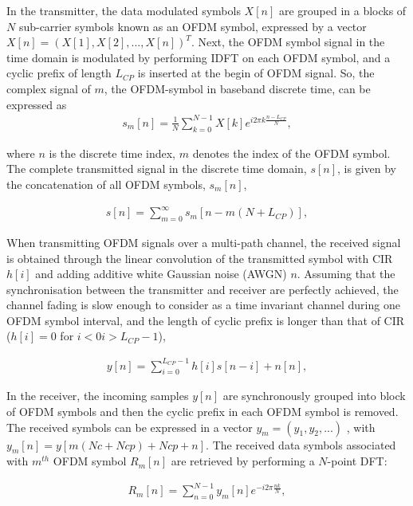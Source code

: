 In the transmitter, the data modulated symbols $X[n]$ are grouped in a blocks of $N$ sub-carrier symbols known as an OFDM symbol, expressed by a vector $X[n]=(X[1], X[2], ..., X[n])^T$. 
Next, the OFDM symbol signal in the time domain is modulated by performing IDFT on each OFDM symbol, and a cyclic prefix of length $L_{CP}$ is inserted at the begin of OFDM signal. 
So, the complex signal of $m$, the OFDM-symbol in baseband discrete time, can be expressed as
\begin{eqnarray}
\label{equ:OFDMsymbol}
s_{m}[n] = \frac{1}{N} \sum_{k=0}^{N-1}X[k]e^{i2\pi k\frac{n-L_{CP}}{N}},
\end{eqnarray} 

where $n$ is the discrete time index, $m$ denotes the index of the OFDM symbol. 
The complete transmitted signal in the discrete time domain, $s[n]$, is given by the concatenation of all OFDM symbols, $s_{m}[n]$,

\begin{eqnarray}
\label{equ:OFDMsignal}
s[n] =  \sum_{m=0}^{\infty} s_{m}[n-m(N+L_{CP})],
\end{eqnarray} 

When transmitting OFDM signals over a multi-path channel, the received signal is obtained through the linear convolution of the transmitted symbol with CIR $h[i]$ and adding additive white Gaussian noise (AWGN) $n$. 
Assuming that the synchronisation between the transmitter and receiver are perfectly achieved, the channel fading is slow enough to consider as a time invariant channel during one OFDM symbol interval, and the length of cyclic prefix is longer than that of CIR ($h[i] = 0$ for $i < 0 i > L_{CP}-1$), 

\begin{eqnarray}
\label{equ:OFDMchannelsignal}
y[n] =  \sum_{i=0}^{L_{CP}-1} h[i]s[n-i] + n[n],
\end{eqnarray} 

In the receiver, the incoming samples $y[n]$ are synchronously  grouped into block of OFDM symbols and then the cyclic prefix in each OFDM symbol is removed. 
The received symbols can be expressed in a vector $y_{m} = (y_{1}, y_{2}, . . . )$ , with $y_{m}[n]=y[m(Nc+Ncp)+Ncp +n]$.
The received data symbols associated with $m^{th}$ OFDM symbol $R_{m}[n]$ are retrieved by performing a $N$-point DFT:

\begin{eqnarray}
\label{equ:receiveOFDMsymbol}
R_{m}[n] =  \sum_{n=0}^{N-1} y_{m}[n]e^{-i2\pi \frac{nk}{N}},
\end{eqnarray} 

